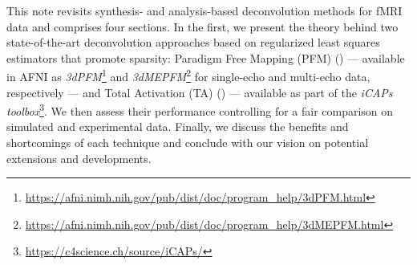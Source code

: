 This note revisits synthesis- and analysis-based deconvolution methods for fMRI data and comprises four sections. In the first, we present the theory behind two state-of-the-art deconvolution approaches based on regularized least squares estimators that promote sparsity: Paradigm Free Mapping (PFM) (\citealt{Gaudes2013Paradigmfreemapping}) --- available in AFNI as \textit{3dPFM}\footnote{\url{https://afni.nimh.nih.gov/pub/dist/doc/program_help/3dPFM.html}} and \textit{3dMEPFM}\footnote{\url{https://afni.nimh.nih.gov/pub/dist/doc/program_help/3dMEPFM.html}} for single-echo and multi-echo data, respectively --- and Total Activation (TA) (\citealt{Karahanoglu2013TotalactivationfMRI}) --- available as part of the \textit{iCAPs toolbox}\footnote{\url{https://c4science.ch/source/iCAPs/}}. We then assess their performance controlling for a fair comparison on simulated and experimental data. Finally, we discuss the benefits and shortcomings of each technique and conclude with our vision on potential extensions and developments.
